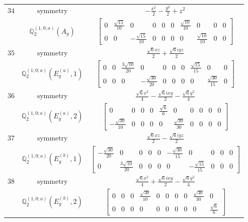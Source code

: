 \documentclass[fleqn,8pt,landscape]{jsarticle}
\begin{document}
\begin{longtable}{ccc}
$ 34 $ & $ \text{symmetry} $ & $ - \frac{x^{2}}{2} - \frac{y^{2}}{2} + z^{2} $ \\
$  $ & $ \mathbb{Q}_{2}^{(1,0;a)}(A_{g}) $ & $ \begin{bmatrix} 0 & \frac{\sqrt{15}}{10} & 0 & 0 & 0 & 0 & \frac{\sqrt{10}}{10} & 0 & 0 & 0 \\ 0 & 0 & - \frac{\sqrt{15}}{10} & 0 & 0 & 0 & 0 & \frac{\sqrt{10}}{10} & 0 & 0 \end{bmatrix} $ \\ \hline
$ 35 $ & $ \text{symmetry} $ & $ \frac{\sqrt{6} x z}{2} + \frac{\sqrt{6} i y z}{2} $ \\
$  $ & $ \mathbb{Q}_{2}^{(1,0;a)}(E_{g}^{(a)},1) $ & $ \begin{bmatrix} 0 & 0 & \frac{3 \sqrt{10}}{20} & 0 & 0 & 0 & 0 & \frac{\sqrt{15}}{15} & 0 & 0 \\ 0 & 0 & 0 & - \frac{\sqrt{30}}{20} & 0 & 0 & 0 & 0 & \frac{\sqrt{30}}{15} & 0 \end{bmatrix} $ \\ \hline
$ 36 $ & $ \text{symmetry} $ & $ \frac{\sqrt{6} x^{2}}{4} - \frac{\sqrt{6} i x y}{2} - \frac{\sqrt{6} y^{2}}{4} $ \\
$  $ & $ \mathbb{Q}_{2}^{(1,0;a)}(E_{g}^{(a)},2) $ & $ \begin{bmatrix} 0 & 0 & 0 & 0 & \frac{\sqrt{6}}{6} & 0 & 0 & 0 & 0 & 0 \\ - \frac{\sqrt{30}}{10} & 0 & 0 & 0 & 0 & \frac{\sqrt{30}}{30} & 0 & 0 & 0 & 0 \end{bmatrix} $ \\ \hline
$ 37 $ & $ \text{symmetry} $ & $ \frac{\sqrt{6} x z}{2} - \frac{\sqrt{6} i y z}{2} $ \\
$  $ & $ \mathbb{Q}_{2}^{(1,0;a)}(E_{g}^{(b)},1) $ & $ \begin{bmatrix} - \frac{\sqrt{30}}{20} & 0 & 0 & 0 & 0 & - \frac{\sqrt{30}}{15} & 0 & 0 & 0 & 0 \\ 0 & \frac{3 \sqrt{10}}{20} & 0 & 0 & 0 & 0 & - \frac{\sqrt{15}}{15} & 0 & 0 & 0 \end{bmatrix} $ \\ \hline
$ 38 $ & $ \text{symmetry} $ & $ \frac{\sqrt{6} x^{2}}{4} + \frac{\sqrt{6} i x y}{2} - \frac{\sqrt{6} y^{2}}{4} $ \\
$  $ & $ \mathbb{Q}_{2}^{(1,0;a)}(E_{g}^{(b)},2) $ & $ \begin{bmatrix} 0 & 0 & 0 & \frac{\sqrt{30}}{10} & 0 & 0 & 0 & 0 & \frac{\sqrt{30}}{30} & 0 \\ 0 & 0 & 0 & 0 & 0 & 0 & 0 & 0 & 0 & \frac{\sqrt{6}}{6} \end{bmatrix} $ \\ \hline

\end{longtable}
\end{document}
